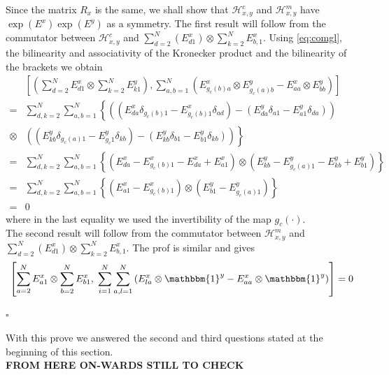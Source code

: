 \documentclass[10pt]{article}
\numberwithin{equation}{section}
\numberwithin{equation}{subsection}
\begin{document}
Since the matrix $R_{x}$ is the same, we shall show that $\mathcal{H}_{x,y}^{c}$ and $\mathcal{H}_{x,y}^{m}$ have $\exp{(E^{x})}\exp{(E^{y})}$ as a symmetry. The first result will follow from the commutator between $\mathcal{H}_{x,y}^{c}$ and $\sum_{d=2}^{N}(E_{d1}^{x})\otimes \sum_{k=2}^{N}E_{b,1}^{x}$. Using \eqref{eq:comgl}, the bilinearity and associativity of the Kronecker product and the bilinearity of the brackets we obtain 
\begin{align*}
	&\left[\left(\sum_{d=2}^{N}E_{d1}^{x}\otimes\sum_{k=2}^{N}E_{k1}^{y}\right), \sum_{a,b=1}^{N}\left(E_{g_{c}(b)a}^{x}\otimes E_{g_{c}(a)b}^{y} -E_{aa}^{x}\otimes E_{bb}^{y}\right)\right]
	\\=&
	\sum_{d,k=2}^{N}\sum_{a,b=1}^{N}\left\{\left((E_{da}^{x}\delta_{g_{c}(b)1}-E_{g_{c}(b)1}^{x}\delta_{ad})-(E_{da}^{y}\delta_{a1}-E_{a1}^{y}\delta_{da})\right)\right. \\ \otimes&\left. \left((E_{kb}^{y}\delta_{g_{c}(a)1}-E_{g_{c}1}^{y}\delta_{kb})-(E_{kb}^{y}\delta_{b1}-E_{b1}^{y}\delta_{kb})\right)\right\}
	\\=&
	\sum_{d,k=2}^{N}\sum_{a,b=1}^{N}\left\{\left(E_{da}^{x}-E_{g_{c}(b)1}^{x}-E_{da}^{x}+E_{a1}^{x}\right)\otimes\left(E_{kb}^{y}-E_{g_{c}(a)1}^{y}-E_{kb}^{y}+E_{b1}^{y}\right)\right\}
	\\=&
	\sum_{d,k=2}^{N}\sum_{a,b=1}^{N}\left\{\left(E_{a1}^{x}-E_{g_{c}(b)1}^{x}\right)\otimes \left(E_{b1}^{y}-E_{g_{c}(a)1}^{y}\right)\right\}
	\\=&0
\end{align*}
where in the last equality we used the invertibility of the map $g_{c}(\cdot)$. \\
The second result will follow from the commutator between $\mathcal{H}_{x,y}^{m}$ and $\sum_{d=2}^{N}(E_{d1}^{x})\otimes \sum_{k=2}^{N}E_{b,1}^{x}$. The prof is similar and gives
\begin{equation}
	\left[\sum_{a=2}^{N}E_{a1}^{x}\otimes \sum_{b=2}^{N}E_{b1}^{x},\;\sum_{i=1}^{N}\sum_{a,l=1}^{N}\left(E_{la}^{x}\otimes \mathbbm{1}^{y}-E_{aa}^{x}\otimes \mathbbm{1}^{y}\right)\right]=0
\end{equation}
\begin{flushright}
	$\square$
\end{flushright}
With this prove we answered the second and third questions stated at the beginning of this section. \\
\textbf{FROM HERE ON-WARDS STILL TO CHECK}\\
\end{document}
